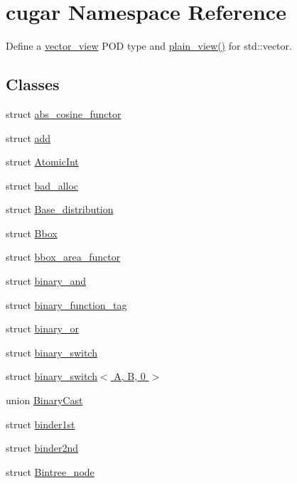 \hypertarget{namespacecugar}{}\section{cugar Namespace Reference}
\label{namespacecugar}


Define a \hyperlink{structcugar_1_1vector__view}{vector\+\_\+view} P\+OD type and \hyperlink{namespacecugar_a347f91de482f0cb8dcba21c086b0aa46}{plain\+\_\+view()} for std\+::vector.  


\subsection*{Classes}
\begin{DoxyCompactItemize}
\item 
struct \hyperlink{structcugar_1_1abs__cosine__functor}{abs\+\_\+cosine\+\_\+functor}
\item 
struct \hyperlink{structcugar_1_1add}{add}
\item 
struct \hyperlink{structcugar_1_1_atomic_int}{Atomic\+Int}
\item 
struct \hyperlink{structcugar_1_1bad__alloc}{bad\+\_\+alloc}
\item 
struct \hyperlink{structcugar_1_1_base__distribution}{Base\+\_\+distribution}
\item 
struct \hyperlink{structcugar_1_1_bbox}{Bbox}
\item 
struct \hyperlink{structcugar_1_1bbox__area__functor}{bbox\+\_\+area\+\_\+functor}
\item 
struct \hyperlink{structcugar_1_1binary__and}{binary\+\_\+and}
\item 
struct \hyperlink{structcugar_1_1binary__function__tag}{binary\+\_\+function\+\_\+tag}
\item 
struct \hyperlink{structcugar_1_1binary__or}{binary\+\_\+or}
\item 
struct \hyperlink{structcugar_1_1binary__switch}{binary\+\_\+switch}
\item 
struct \hyperlink{structcugar_1_1binary__switch_3_01_a_00_01_b_00_010_01_4}{binary\+\_\+switch$<$ A, B, 0 $>$}
\item 
union \hyperlink{unioncugar_1_1_binary_cast}{Binary\+Cast}
\item 
struct \hyperlink{structcugar_1_1binder1st}{binder1st}
\item 
struct \hyperlink{structcugar_1_1binder2nd}{binder2nd}
\item 
struct \hyperlink{structcugar_1_1_bintree__node}{Bintree\+\_\+node}

\end{DoxyCompactItemize}
